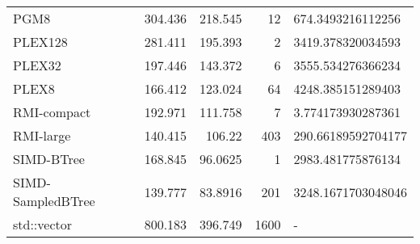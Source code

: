 \begin{tabular}{lrrrl}
 PGM8              &                304.436 &              218.545  &           12 & 674.3493216112256  \\
 PLEX128           &                281.411 &              195.393  &            2 & 3419.378320034593  \\
 PLEX32            &                197.446 &              143.372  &            6 & 3555.534276366234  \\
 PLEX8             &                166.412 &              123.024  &           64 & 4248.385151289403  \\
 RMI-compact       &                192.971 &              111.758  &            7 & 3.774173930287361  \\
 RMI-large         &                140.415 &              106.22   &          403 & 290.66189592704177 \\
 SIMD-BTree        &                168.845 &               96.0625 &            1 & 2983.481775876134  \\
 SIMD-SampledBTree &                139.777 &               83.8916 &          201 & 3248.1671703048046 \\
 std::vector       &                800.183 &              396.749  &         1600 & -                  \\
\hline
\end{tabular}